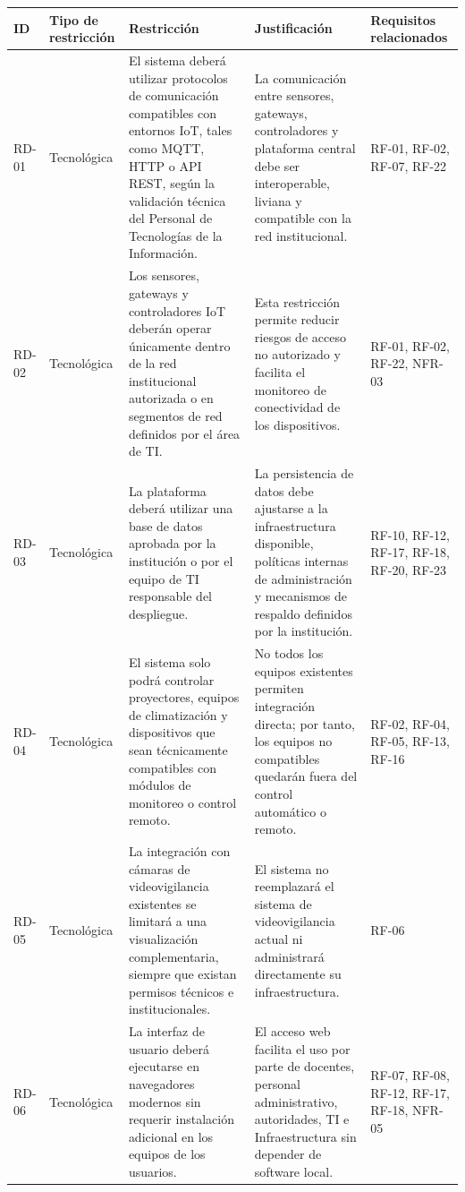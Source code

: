 \begingroup
\small
\begin{longtable}{|p{3.1cm}|p{3.1cm}|p{3.1cm}|p{3.1cm}|p{3.1cm}|}
\hline
ID & Tipo de restricción & Restricción & Justificación & Requisitos relacionados \\ \hline
RD-01 & Tecnológica & El sistema deberá utilizar protocolos de comunicación compatibles con entornos IoT, tales como MQTT, HTTP o API REST, según la validación técnica del Personal de Tecnologías de la Información. & La comunicación entre sensores, gateways, controladores y plataforma central debe ser interoperable, liviana y compatible con la red institucional. & RF-01, RF-02, RF-07, RF-22 \\ \hline
RD-02 & Tecnológica & Los sensores, gateways y controladores IoT deberán operar únicamente dentro de la red institucional autorizada o en segmentos de red definidos por el área de TI. & Esta restricción permite reducir riesgos de acceso no autorizado y facilita el monitoreo de conectividad de los dispositivos. & RF-01, RF-02, RF-22, NFR-03 \\ \hline
RD-03 & Tecnológica & La plataforma deberá utilizar una base de datos aprobada por la institución o por el equipo de TI responsable del despliegue. & La persistencia de datos debe ajustarse a la infraestructura disponible, políticas internas de administración y mecanismos de respaldo definidos por la institución. & RF-10, RF-12, RF-17, RF-18, RF-20, RF-23 \\ \hline
RD-04 & Tecnológica & El sistema solo podrá controlar proyectores, equipos de climatización y dispositivos que sean técnicamente compatibles con módulos de monitoreo o control remoto. & No todos los equipos existentes permiten integración directa; por tanto, los equipos no compatibles quedarán fuera del control automático o remoto. & RF-02, RF-04, RF-05, RF-13, RF-16 \\ \hline
RD-05 & Tecnológica & La integración con cámaras de videovigilancia existentes se limitará a una visualización complementaria, siempre que existan permisos técnicos e institucionales. & El sistema no reemplazará el sistema de videovigilancia actual ni administrará directamente su infraestructura. & RF-06 \\ \hline
RD-06 & Tecnológica & La interfaz de usuario deberá ejecutarse en navegadores modernos sin requerir instalación adicional en los equipos de los usuarios. & El acceso web facilita el uso por parte de docentes, personal administrativo, autoridades, TI e Infraestructura sin depender de software local. & RF-07, RF-08, RF-12, RF-17, RF-18, NFR-05 \\ \hline

\end{longtable}

